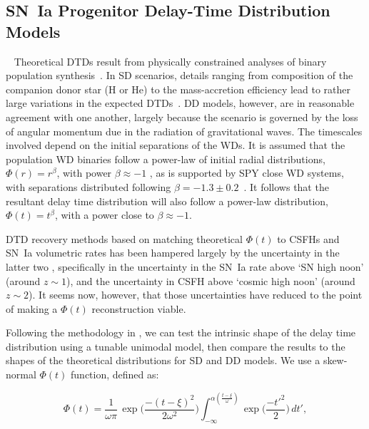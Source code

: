 \documentclass[apj]{aastex62}
\begin{document}
\subsection{SN~Ia Progenitor Delay-Time Distribution Models}~\label{sec:dtd}
Theoretical DTDs result from physically constrained analyses of binary population synthesis~\cite[see][ for a review]{Wang:2012a}.  In SD scenarios, details ranging from composition of the companion donor star (H or He) to the mass-accretion efficiency lead to rather large variations in the expected DTDs~\cite{Nelemans:2013}. DD models, however, are in reasonable agreement with one another, largely because the scenario is governed by the loss of angular momentum due in the radiation of gravitational waves. The timescales involved depend on the  initial separations of the WDs. It is assumed that the population WD binaries follow a power-law of initial radial distributions, $\Phi(r)=r^{\beta}$, with power $\beta\approx-1$ \citep{Opik:1924xr}, as is supported by SPY close WD systems, with separations distributed following $\beta=-1.3\pm0.2$~\citep{Maoz:2017zl}. It follows that the resultant delay time distribution will also follow a power-law distribution, $\Phi(t)=t^{\beta}$, with a power close to $\beta\approx-1$.

DTD recovery methods based on matching theoretical $\Phi(t)$ to CSFHs and SN~Ia volumetric rates has been hampered largely by the uncertainty in the latter two \citep{Dahlen:2008,Strolger:2010,Graur:2014,Rodney:2014fj}, specifically in the uncertainty in the SN~Ia rate above `SN high noon' (around $z\sim1$), and the uncertainty in CSFH above `cosmic high noon' (around $z\sim2$). It seems now, however, that those uncertainties have reduced to the point of making a $\Phi(t)$ reconstruction viable.

Following the methodology in \cite{Strolger:2010}, we can test the intrinsic shape of the delay time distribution using a tunable unimodal model, then compare the results to the shapes of the theoretical distributions for SD and DD models. We use a skew-normal $\Phi(t)$ function, defined as:

\begin{equation}
	\Phi(t)=\frac{1}{\omega\pi}\,\exp\biggl(\frac{-(t-\xi)^2}{2\omega^2}\biggr)\int_{-\infty}^{\alpha (\frac{t-\xi}{\omega})} \exp\biggl(\frac{-t'^2}{2}\biggr)\,dt',
\label{eqn:model}
\end{equation}
\end{document}
